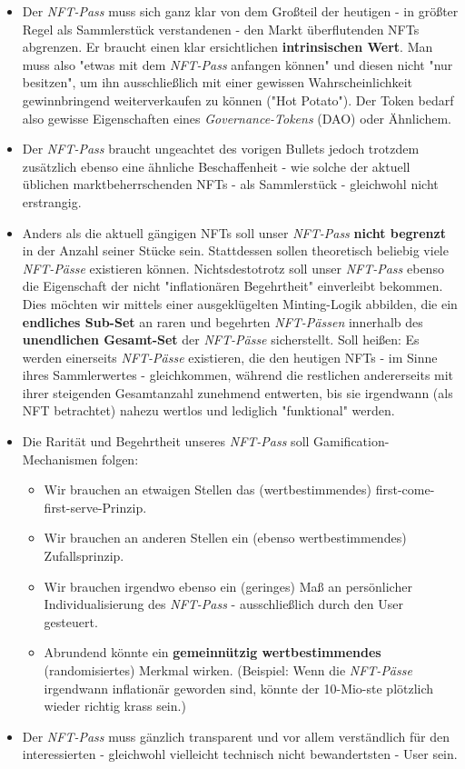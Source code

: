 \begin{itemize}
  \item Der \textit{NFT-Pass} muss sich ganz klar von dem Großteil der heutigen - in größter Regel als Sammlerstück verstandenen - den Markt überflutenden NFTs abgrenzen. Er braucht einen klar ersichtlichen \textbf{intrinsischen Wert}. Man muss also "etwas mit dem \textit{NFT-Pass} anfangen können" und diesen nicht "nur besitzen", um ihn ausschließlich mit einer gewissen Wahrscheinlichkeit gewinnbringend weiterverkaufen zu können ("Hot Potato"). Der Token bedarf also gewisse Eigenschaften eines \textit{Governance-Tokens} (DAO) oder Ähnlichem.
  \item Der \textit{NFT-Pass} braucht ungeachtet des vorigen Bullets jedoch trotzdem zusätzlich ebenso eine ähnliche Beschaffenheit - wie solche der aktuell üblichen marktbeherrschenden NFTs - als Sammlerstück - gleichwohl nicht erstrangig. 
  \item Anders als die aktuell gängigen NFTs soll unser \textit{NFT-Pass} \textbf{nicht begrenzt} in der Anzahl seiner Stücke sein. Stattdessen sollen theoretisch beliebig viele \textit{NFT-Pässe} existieren können. Nichtsdestotrotz soll unser \textit{NFT-Pass} ebenso die Eigenschaft der nicht "inflationären Begehrtheit" einverleibt bekommen. Dies möchten wir mittels einer ausgeklügelten Minting-Logik abbilden, die ein \textbf{endliches Sub-Set} an raren und begehrten \textit{NFT-Pässen} innerhalb des \textbf{unendlichen Gesamt-Set} der \textit{NFT-Pässe} sicherstellt. Soll heißen: Es werden einerseits \textit{NFT-Pässe} existieren, die den heutigen NFTs - im Sinne ihres Sammlerwertes - gleichkommen, während die restlichen andererseits mit ihrer steigenden Gesamtanzahl zunehmend entwerten, bis sie irgendwann (als NFT betrachtet) nahezu wertlos und lediglich "funktional" werden.
  \item Die Rarität und Begehrtheit unseres \textit{NFT-Pass} soll Gamification-Mechanismen folgen:
  \begin{itemize}
    \item Wir brauchen an etwaigen Stellen das (wertbestimmendes) first-come-first-serve-Prinzip.
    \item Wir brauchen an anderen Stellen ein (ebenso wertbestimmendes) Zufallsprinzip.
    \item Wir brauchen irgendwo ebenso ein (geringes) Maß an persönlicher Individualisierung des \textit{NFT-Pass} - ausschließlich durch den User gesteuert.
    \item Abrundend könnte ein \textbf{gemeinnützig wertbestimmendes} (randomisiertes) Merkmal wirken. (Beispiel: Wenn die \textit{NFT-Pässe} irgendwann inflationär geworden sind, könnte der 10-Mio-ste plötzlich wieder richtig krass sein.)
  \end{itemize}
  \item Der \textit{NFT-Pass} muss gänzlich transparent und vor allem verständlich für den interessierten - gleichwohl vielleicht technisch nicht bewandertsten - User sein.
\end{itemize}

